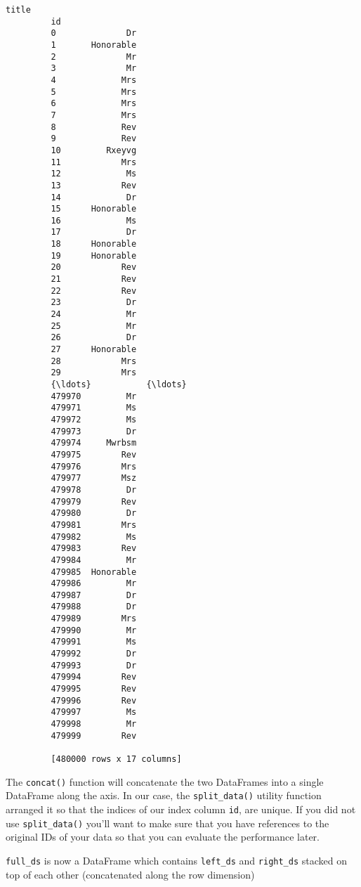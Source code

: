 \documentclass[11pt]{article}
\begin{document}
\begin{Verbatim}[commandchars=\\\{\}]
                     title  
         id                 
         0              Dr  
         1       Honorable  
         2              Mr  
         3              Mr  
         4             Mrs  
         5             Mrs  
         6             Mrs  
         7             Mrs  
         8             Rev  
         9             Rev  
         10         Rxeyvg  
         11            Mrs  
         12             Ms  
         13            Rev  
         14             Dr  
         15      Honorable  
         16             Ms  
         17             Dr  
         18      Honorable  
         19      Honorable  
         20            Rev  
         21            Rev  
         22            Rev  
         23             Dr  
         24             Mr  
         25             Mr  
         26             Dr  
         27      Honorable  
         28            Mrs  
         29            Mrs  
         {\ldots}           {\ldots}  
         479970         Mr  
         479971         Ms  
         479972         Ms  
         479973         Dr  
         479974     Mwrbsm  
         479975        Rev  
         479976        Mrs  
         479977        Msz  
         479978         Dr  
         479979        Rev  
         479980         Dr  
         479981        Mrs  
         479982         Ms  
         479983        Rev  
         479984         Mr  
         479985  Honorable  
         479986         Mr  
         479987         Dr  
         479988         Dr  
         479989        Mrs  
         479990         Mr  
         479991         Ms  
         479992         Dr  
         479993         Dr  
         479994        Rev  
         479995        Rev  
         479996        Rev  
         479997         Ms  
         479998         Mr  
         479999        Rev  
         
         [480000 rows x 17 columns]
\end{Verbatim}
            
    The \texttt{concat()} function will concatenate the two DataFrames into
a single DataFrame along the axis. In our case, the
\texttt{split\_data()} utility function arranged it so that the indices
of our index column \texttt{id}, are unique. If you did not use
\texttt{split\_data()} you'll want to make sure that you have references
to the original IDs of your data so that you can evaluate the
performance later.

\texttt{full\_ds} is now a DataFrame which contains \texttt{left\_ds}
and \texttt{right\_ds} stacked on top of each other (concatenated along
the row dimension)
\end{document}
